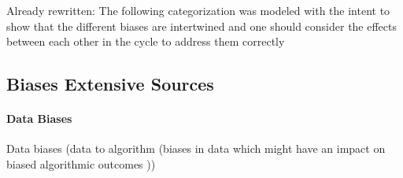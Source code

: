 \documentclass[12pt, a4paper, oneside]{book}   	%
\newif\ifrawcitationactive
\newcommand{\rawcitationstart}{\color{purple}\rawcitationactivetrue}
\begin{document}
			Already rewritten: The following categorization was modeled with the intent to show that the different biases are intertwined and one should consider the effects between each other in the cycle to address them correctly \autocite{Mehrabi_2021}
		




			\rawcitationstart
			\subsection{Biases Extensive Sources}
			
			\paragraph{Data Biases}
			Data biases (data to algorithm (biases in data which might have an impact on biased algorithmic outcomes \autocite{Mehrabi_2021}))	
\end{document}
